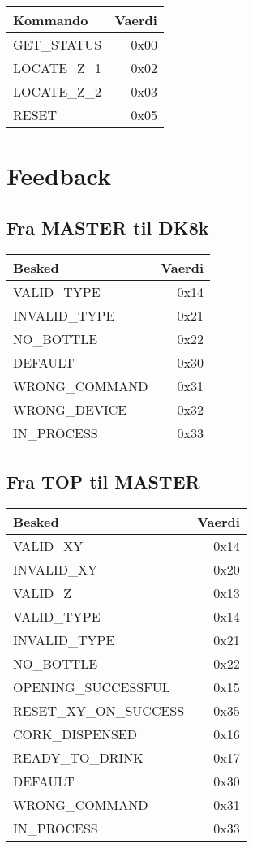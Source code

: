 \begin{table}[H]
\begin{tabular}{| l | r |}
\hline
Kommando & Vaerdi\\\hline
GET\_STATUS & 0x00\\\hline
LOCATE\_Z\_1 & 0x02\\\hline
LOCATE\_Z\_2 & 0x03\\\hline
RESET & 0x05\\\hline
\end{tabular}
\end{table}

\section{Feedback}
\subsection{Fra MASTER til DK8k}

\begin{table}[H]
\begin{tabular}{| l | r |}
\hline
Besked & Vaerdi\\\hline
VALID\_TYPE & 0x14\\\hline
INVALID\_TYPE & 0x21\\\hline
NO\_BOTTLE & 0x22\\\hline
DEFAULT & 0x30\\\hline
WRONG\_COMMAND & 0x31\\\hline
WRONG\_DEVICE & 0x32\\\hline
IN\_PROCESS & 0x33\\\hline
\end{tabular}
\end{table}

\subsection{Fra TOP til MASTER}

\begin{table}[H]
\begin{tabular}{| l | r |}
\hline
Besked & Vaerdi\\\hline
VALID\_XY & 0x14\\\hline
INVALID\_XY & 0x20\\\hline
VALID\_Z & 0x13\\\hline
VALID\_TYPE & 0x14\\\hline
INVALID\_TYPE & 0x21\\\hline
NO\_BOTTLE & 0x22\\\hline
OPENING\_SUCCESSFUL & 0x15\\\hline
RESET\_XY\_ON\_SUCCESS & 0x35\\\hline
CORK\_DISPENSED & 0x16\\\hline
READY\_TO\_DRINK & 0x17\\\hline
DEFAULT & 0x30\\\hline
WRONG\_COMMAND & 0x31\\\hline
IN\_PROCESS & 0x33\\\hline
\end{tabular}
\end{table}

